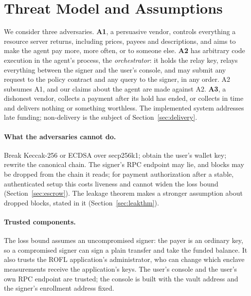 \section{Threat Model and Assumptions}
\label{sec:threat}

We consider three adversaries.
\textbf{A1}, a persuasive vendor, controls everything a resource server returns, including prices, payees
and descriptions, and aims to make the agent pay more, more often, or to someone else.
\textbf{A2} has arbitrary code execution in the agent's process, the \emph{orchestrator}: it holds the relay
key, relays everything between the signer and the user's console, and may submit any request to the policy
contract and any query to the signer, in any order. A2 subsumes A1, and our claims about the agent are made
against A2. \textbf{A3}, a dishonest vendor, collects a payment after its hold has ended, or collects in
time and delivers nothing or something worthless. The implemented system addresses late funding;
non-delivery is the subject of Section~\ref{sec:delivery}.

\paragraph{What the adversaries cannot do.} Break Keccak-256 or ECDSA over secp256k1; obtain the user's
wallet key; rewrite the canonical chain. The signer's RPC endpoint may lie, and blocks may be dropped from
the chain it reads; for payment authorization after a stable, authenticated setup this costs liveness and
cannot widen the loss bound (Section~\ref{sec:escrow}). The leakage theorem makes a stronger assumption
about dropped blocks, stated in it (Section~\ref{sec:leakthm}).

\paragraph{Trusted components.} The loss bound assumes an uncompromised signer: the payer is an ordinary
key, so a compromised signer can sign a plain transfer and take the funded balance. It also trusts the
ROFL application's administrator, who can change which enclave measurements receive the application's
keys. The user's console and the user's own RPC endpoint are trusted; the console is built with the vault
address and the signer's enrollment address fixed.

